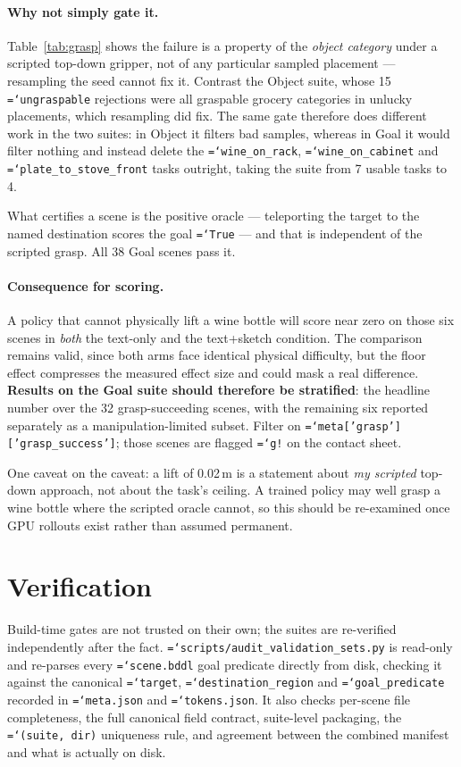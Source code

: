 \documentclass[11pt,a4paper]{article}
\newcommand{\code}[1]{\texttt{\small\hyphenchar\font=`\-\relax #1}}
\begin{document}
\paragraph{Why not simply gate it.}
Table~\ref{tab:grasp} shows the failure is a property of the \emph{object
category} under a scripted top-down gripper, not of any particular sampled
placement --- resampling the seed cannot fix it. Contrast the Object suite, whose
15 \code{ungraspable} rejections were all graspable grocery categories in
unlucky placements, which resampling did fix. The same gate therefore does
different work in the two suites: in Object it filters bad samples, whereas in
Goal it would filter nothing and instead delete the \code{wine\_on\_rack},
\code{wine\_on\_cabinet} and \code{plate\_to\_stove\_front} tasks outright,
taking the suite from 7 usable tasks to 4.

What certifies a scene is the positive oracle --- teleporting the target to the
named destination scores the goal \code{True} --- and that is independent of the
scripted grasp. All 38 Goal scenes pass it.

\paragraph{Consequence for scoring.}
A policy that cannot physically lift a wine bottle will score near zero on those
six scenes in \emph{both} the text-only and the text+sketch condition. The
comparison remains valid, since both arms face identical physical difficulty, but
the floor effect compresses the measured effect size and could mask a real
difference. \textbf{Results on the Goal suite should therefore be stratified}:
the headline number over the 32 grasp-succeeding scenes, with the remaining six
reported separately as a manipulation-limited subset. Filter on
\code{meta['grasp']['grasp\_success']}; those scenes are flagged \code{g!} on the
contact sheet.

One caveat on the caveat: a lift of 0.02\,m is a statement about \emph{my
scripted} top-down approach, not about the task's ceiling. A trained policy may
well grasp a wine bottle where the scripted oracle cannot, so this should be
re-examined once GPU rollouts exist rather than assumed permanent.

\section{Verification}

Build-time gates are not trusted on their own; the suites are re-verified
independently after the fact. \code{scripts/audit\_validation\_sets.py} is
read-only and re-parses every \code{scene.bddl} goal predicate directly from
disk, checking it against the canonical \code{target},
\code{destination\_region} and \code{goal\_predicate} recorded in
\code{meta.json} and \code{tokens.json}. It also checks per-scene file
completeness, the full canonical field contract, suite-level packaging, the
\code{(suite, dir)} uniqueness rule, and agreement between the combined manifest
and what is actually on disk.
\end{document}
